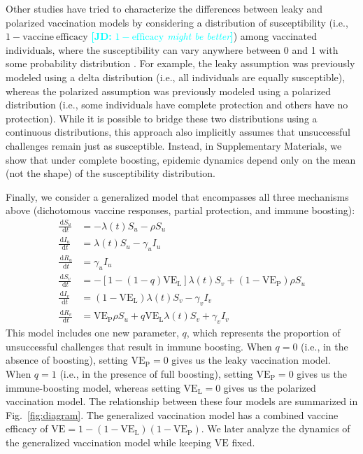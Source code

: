 \documentclass[12pt]{article}
\newcommand{\comment}{\showcomment}
\newcommand{\showcomment}[3]{\textcolor{#1}{\textbf{[#2: }\textsl{#3}\textbf{]}}}
\newcommand{\jd}[1]{\comment{cyan}{JD}{#1}}
\newcommand{\fref}[1]{Fig.~\ref{fig:#1}}
\newcommand{\dd}[1]{\ensuremath{\, \mathrm{d}#1}}
\newcommand{\VE}{\ensuremath{\mathrm{VE}}}
\newcommand{\VEP}{\ensuremath{\VE_{\mathrm{P}}}}
\newcommand{\VEL}{\ensuremath{\VE_{\mathrm{L}}}}
\begin{document}
Other studies have tried to characterize the differences between leaky and polarized vaccination models by considering a distribution of susceptibility (i.e., $1-\mathrm{vaccine~efficacy}$ \jd{$1-\mathrm{efficacy}$ might be better}) among vaccinated individuals, where the susceptibility can vary anywhere between 0 and 1 with some probability distribution \citep{gomes2014missing}.
For example, the leaky assumption was previously modeled using a delta distribution (i.e., all individuals are equally susceptible), whereas the polarized assumption was previously modeled using a polarized distribution (i.e., some individuals have complete protection and others have no protection). 
While it is possible to bridge these two distributions using a continuous distributions, this approach also implicitly assumes that unsuccessful challenges remain just as susceptible.
Instead, in Supplementary Materials, we show that under complete boosting, epidemic dynamics depend only on the mean (not the shape) of the susceptibility distribution.

Finally, we consider a generalized model that encompasses all three mechanisms above (dichotomous vaccine responses, partial protection, and immune boosting):
\begin{align}
\frac{\dd S_u}{\dd t} &= - \lambda(t) S_u - \rho S_u \\
\frac{\dd I_u}{\dd t} &= \lambda(t) S_u - \gamma_u I_u \\
\frac{\dd R_u}{\dd t} &= \gamma_u I_u \\
\frac{\dd S_v}{\dd t} &= - [1- (1-q) \VEL] \lambda(t) S_v + (1-\VEP) \rho S_u \\
\frac{\dd I_v}{\dd t} &= (1-\VEL) \lambda(t) S_v - \gamma_v I_v \\
\frac{\dd R_v}{\dd t} &= \VEP \rho S_u + q \VEL \lambda(t) S_v + \gamma_v I_v
\end{align}
This model includes one new parameter, $q$, which represents the proportion of unsuccessful challenges that result in immune boosting.
When $q=0$ (i.e., in the absence of boosting), setting $\VEP = 0$ gives us the leaky vaccination model. 
When $q=1$ (i.e., in the presence of full boosting), setting $\VEP = 0$ gives us the immune-boosting model, whereas setting $\VEL = 0$ gives us the polarized vaccination model. 
The relationship between these four models are summarized in \fref{diagram}.
The generalized vaccination model has a combined vaccine efficacy of $\VE = 1- (1-\VEL) (1-\VEP)$.
We later analyze the dynamics of the generalized vaccination model while keeping $\VE$ fixed.
\end{document}
